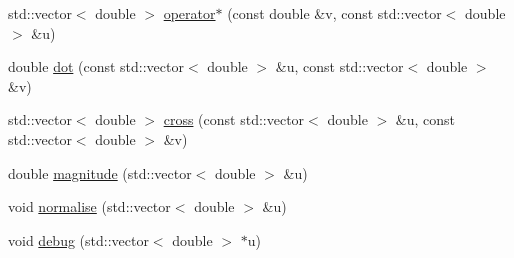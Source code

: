 \begin{DoxyCompactItemize}
\item 
std\-::vector$<$ double $>$ \hyperlink{vector__ops_8hh_a3e45857d78b90e93c15744ad8798e156}{operator$\ast$} (const double \&v, const std\-::vector$<$ double $>$ \&u)
\item 
double \hyperlink{vector__ops_8hh_aea2ad4f8bf6995dcbfbf338f6c76c26a}{dot} (const std\-::vector$<$ double $>$ \&u, const std\-::vector$<$ double $>$ \&v)
\item 
std\-::vector$<$ double $>$ \hyperlink{vector__ops_8hh_a53272d0abcdabcea632b33faff66f87e}{cross} (const std\-::vector$<$ double $>$ \&u, const std\-::vector$<$ double $>$ \&v)
\item 
double \hyperlink{vector__ops_8hh_a9922580c87b6082ce517d458c57e5b12}{magnitude} (std\-::vector$<$ double $>$ \&u)
\item 
void \hyperlink{vector__ops_8hh_a716a21c6612fb12f0e9ddc29568be9a8}{normalise} (std\-::vector$<$ double $>$ \&u)
\item 
void \hyperlink{vector__ops_8hh_ab6ebab8281b91e79e3fc11e125eec557}{debug} (std\-::vector$<$ double $>$ $\ast$u)
\end{DoxyCompactItemize}


